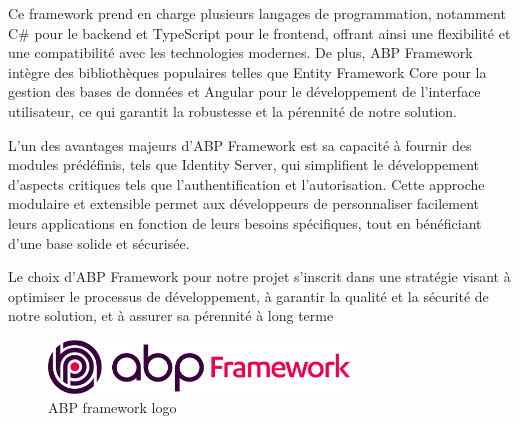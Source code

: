Ce framework prend en charge plusieurs langages de programmation, notamment C\# pour le backend et TypeScript pour le frontend, offrant ainsi une flexibilité et une compatibilité avec les technologies modernes. De plus, ABP Framework intègre des bibliothèques populaires telles que Entity Framework Core pour la gestion des bases de données et Angular pour le développement de l'interface utilisateur, ce qui garantit la robustesse et la pérennité de notre solution.

L'un des avantages majeurs d'ABP Framework est sa capacité à fournir des modules prédéfinis, tels que Identity Server, qui simplifient le développement d'aspects critiques tels que l'authentification et l'autorisation. Cette approche modulaire et extensible permet aux développeurs de personnaliser facilement leurs applications en fonction de leurs besoins spécifiques, tout en bénéficiant d'une base solide et sécurisée.

Le choix d'ABP Framework pour notre projet s'inscrit dans une stratégie visant à optimiser le processus de développement, à garantir la qualité et la sécurité de notre solution, et à assurer sa pérennité à long terme
\\
\begin{figure}[H]
    \centering
    \includegraphics[width=8cm]{Figures/abp.png}
    \caption{ABP framework logo}
\end{figure}






